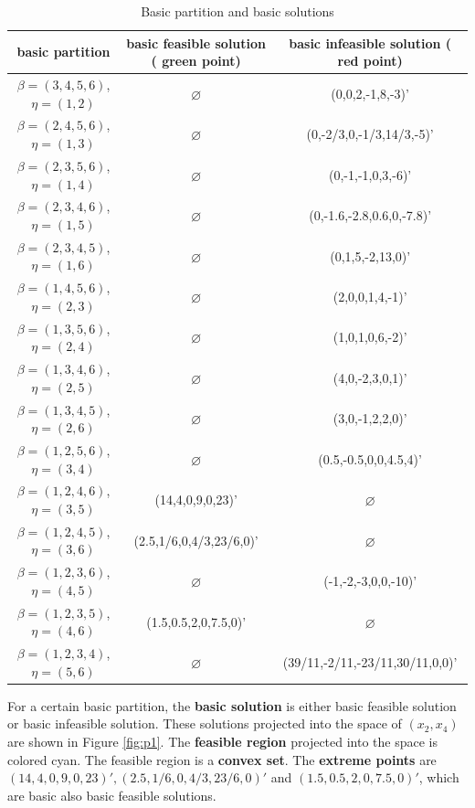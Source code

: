 \begin{table}[!h]
\centering
\small
\begin{tabular}{|c|c|c|}\hline

\textbf{basic partition} & \textbf{basic feasible solution} ({\color{green} green} point) & \textbf{basic infeasible solution} ({\color{red} red} point) \\\hline\hline
$\beta = (3,4,5,6) $, $\eta = (1,2)$ & $\varnothing$ & (0,0,2,-1,8,-3)' \\\hline
$\beta = (2,4,5,6) $, $\eta = (1,3)$ & $\varnothing$ & (0,-2/3,0,-1/3,14/3,-5)' \\\hline
$\beta = (2,3,5,6) $, $\eta = (1,4)$ & $\varnothing$ & (0,-1,-1,0,3,-6)' \\\hline
$\beta = (2,3,4,6) $, $\eta = (1,5)$ & $\varnothing$ & (0,-1.6,-2.8,0.6,0,-7.8)' \\\hline
$\beta = (2,3,4,5) $, $\eta = (1,6)$ & $\varnothing$ & (0,1,5,-2,13,0)' \\\hline
$\beta = (1,4,5,6) $, $\eta = (2,3)$ & $\varnothing$ & (2,0,0,1,4,-1)' \\\hline
$\beta = (1,3,5,6) $, $\eta = (2,4)$ & $\varnothing$ & (1,0,1,0,6,-2)'\\\hline
$\beta = (1,3,4,6) $, $\eta = (2,5)$ & $\varnothing$ & (4,0,-2,3,0,1)'\\\hline
$\beta = (1,3,4,5) $, $\eta = (2,6)$ & $\varnothing$ & (3,0,-1,2,2,0)'\\\hline
$\beta = (1,2,5,6) $, $\eta = (3,4)$ & $\varnothing$ & (0.5,-0.5,0,0,4.5,4)' \\\hline
$\beta = (1,2,4,6) $, $\eta = (3,5)$ & (14,4,0,9,0,23)' & $\varnothing$ \\\hline
$\beta = (1,2,4,5) $, $\eta = (3,6)$ & (2.5,1/6,0,4/3,23/6,0)' & $\varnothing$ \\\hline
$\beta = (1,2,3,6) $, $\eta = (4,5)$ & $\varnothing$ & (-1,-2,-3,0,0,-10)' \\\hline
$\beta = (1,2,3,5) $, $\eta = (4,6)$ & (1.5,0.5,2,0,7.5,0)' & $\varnothing$ \\\hline
$\beta = (1,2,3,4) $, $\eta = (5,6)$ & $\varnothing$ & (39/11,-2/11,-23/11,30/11,0,0)' \\\hline

\end{tabular}
\caption{Basic partition and basic solutions}
\label{tab:par-sol}
\end{table}

For a certain basic partition, the \textbf{basic solution} is either basic feasible solution or basic infeasible solution. These solutions projected into the space of $(x_2,x_4)$ are shown in Figure \ref{fig:p1}. The \textbf{feasible region} projected into the space is colored {\color{cyan} cyan}. The feasible region is a \textbf{convex set}. The \textbf{extreme points} are $(14,4,0,9,0,23)',(2.5,1/6,0,4/3,23/6,0)' $ and $(1.5,0.5,2,0,7.5,0)'$, which are basic also basic feasible solutions.


